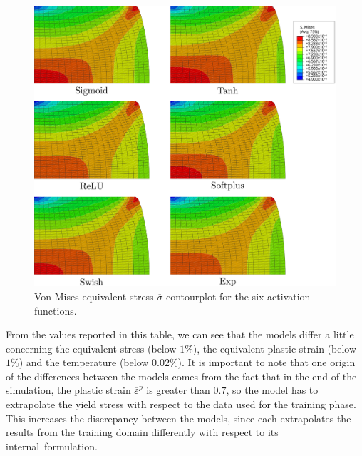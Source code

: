 \documentclass[algorithms,article,accept,pdftex,oneauthor]{Definitions/mdpi}
\begin{document}

\vspace{-6pt}

\begin{figure}[H]
\includegraphics[width=0.87\columnwidth]{Figures/MisesHalf}
\caption{{Von} Mises equivalent stress $\overline{\sigma}$ contourplot for the six activation functions.}
\label{fig:Num-misesCP}
\end{figure}



From the values reported in this table, we can see that the models differ a little concerning the equivalent stress (below $1\%$), the equivalent plastic strain (below $1\%$) and the temperature (below $0.02\%$).
It is important to note that one origin of the differences between the models comes from the fact that in the end of the simulation, the plastic strain $\overline{\varepsilon}^p$ is greater than $0.7$, so the model has to extrapolate the yield stress with respect to the data used for the training phase.
This increases the discrepancy between the models, since each extrapolates the results from the training domain differently with respect to its internal~formulation.
\end{document}
